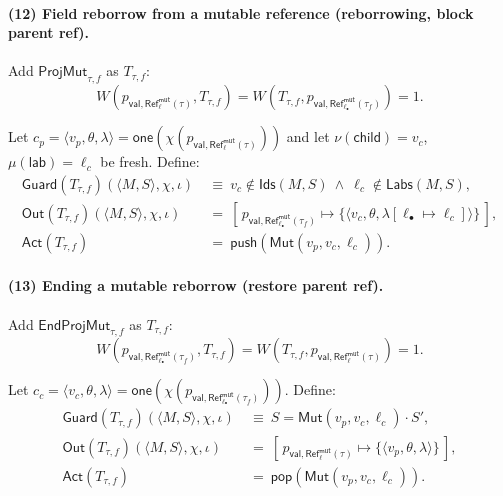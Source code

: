 \documentclass[sigconf]{acmart}
\begin{document}
\paragraph{(12) Field reborrow from a mutable reference (reborrowing, block parent ref).}
Add $\mathsf{ProjMut}_{\tau,f}$ as $T_{\tau,f}$: 
\begin{equation*}
    W(p_{\mathsf{val},\mathsf{Ref}^{\mathsf{mut}}_{\ell}(\tau)},T_{\tau,f})=W(T_{\tau,f},p_{\mathsf{val},\mathsf{Ref}^{\mathsf{mut}}_{\ell_{\bullet}}(\tau_f)})=1.
\end{equation*}

Let $c_p=\langle v_p,\theta,\lambda\rangle=\mathsf{one}(\chi(p_{\mathsf{val},\mathsf{Ref}^{\mathsf{mut}}_{\ell}(\tau)}))$
and let $\nu(\mathsf{child})=v_c$, $\mu(\mathsf{lab})=\ell_c$ be fresh. Define:
\begin{align*}
\mathsf{Guard}(T_{\tau,f})(\langle M,S\rangle,\chi,\iota)
&~\equiv~ v_c\notin \mathsf{Ids}(M,S)\ \wedge\ \ell_c\notin \mathsf{Labs}(M,S),\\
\mathsf{Out}(T_{\tau,f})(\langle M,S\rangle,\chi,\iota)
&~=~ [\,p_{\mathsf{val},\mathsf{Ref}^{\mathsf{mut}}_{\ell_{\bullet}}(\tau_f)}\mapsto
      \{\langle v_c,\theta,\lambda[\ell_{\bullet}\mapsto \ell_c]\rangle\}\,],\\
\mathsf{Act}(T_{\tau,f})
&~=~ \mathsf{push}(\mathsf{Mut}(v_p,v_c,\ell_c)).
\end{align*}

\paragraph{(13) Ending a mutable reborrow (restore parent ref).}
Add $\mathsf{EndProjMut}_{\tau,f}$ as $T_{\tau,f}$:
\begin{equation*}
    W(p_{\mathsf{val},\mathsf{Ref}^{\mathsf{mut}}_{\ell_{\bullet}}(\tau_f)},T_{\tau,f})=W(T_{\tau,f},p_{\mathsf{val},\mathsf{Ref}^{\mathsf{mut}}_{\ell}(\tau)})=1.
\end{equation*}

Let $c_c=\langle v_c,\theta,\lambda\rangle=\mathsf{one}(\chi(p_{\mathsf{val},\mathsf{Ref}^{\mathsf{mut}}_{\ell_{\bullet}}(\tau_f)}))$.
Define:
\begin{align*}
\mathsf{Guard}(T_{\tau,f})(\langle M,S\rangle,\chi,\iota)
&~\equiv~ S=\mathsf{Mut}(v_p,v_c,\ell_c)\cdot S',\\
\mathsf{Out}(T_{\tau,f})(\langle M,S\rangle,\chi,\iota)
&~=~ [\,p_{\mathsf{val},\mathsf{Ref}^{\mathsf{mut}}_{\ell}(\tau)}\mapsto \{\langle v_p,\theta,\lambda\rangle\}\,],\\
\mathsf{Act}(T_{\tau,f})
&~=~ \mathsf{pop}(\mathsf{Mut}(v_p,v_c,\ell_c)).
\end{align*}
\end{document}
